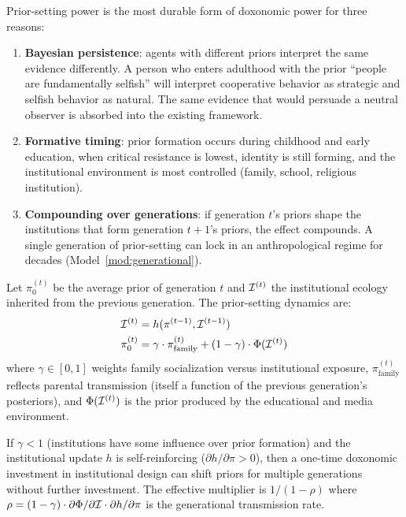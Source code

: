 Prior-setting power is the most durable form of doxonomic power for three reasons:

\begin{enumerate}[nosep]
  \item \textbf{Bayesian persistence}: agents with different priors interpret the same evidence differently.
  A person who enters adulthood with the prior ``people are fundamentally selfish'' will interpret cooperative behavior as strategic and selfish behavior as natural.
  The same evidence that would persuade a neutral observer is absorbed into the existing framework.

  \item \textbf{Formative timing}: prior formation occurs during childhood and early education, when critical resistance is lowest, identity is still forming, and the institutional environment is most controlled (family, school, religious institution).

  \item \textbf{Compounding over generations}: if generation $t$'s priors shape the institutions that form generation $t+1$'s priors, the effect compounds.
  A single generation of prior-setting can lock in an anthropological regime for decades (Model~\ref{mod:generational}).
\end{enumerate}

\begin{model}
\label{mod:prior-setting}
Let $\pi_0^{(t)}$ be the average prior of generation $t$ and $\mathcal{I}^{(t)}$ the institutional ecology inherited from the previous generation.
The prior-setting dynamics are:
\begin{align}
  \mathcal{I}^{(t)} &= h(\pi^{(t-1)}, \mathcal{I}^{(t-1)}) \label{eq:inst-update} \\
  \pi_0^{(t)} &= \gamma \cdot \pi_{\text{family}}^{(t)} + (1-\gamma) \cdot \Phi(\mathcal{I}^{(t)}) \label{eq:prior-formation}
\end{align}
where $\gamma \in [0,1]$ weights family socialization versus institutional exposure, $\pi_{\text{family}}^{(t)}$ reflects parental transmission (itself a function of the previous generation's posteriors), and $\Phi(\mathcal{I}^{(t)})$ is the prior produced by the educational and media environment.
\end{model}

\begin{proposition}
\label{prop:compounding}
If $\gamma < 1$ (institutions have some influence over prior formation) and the institutional update $h$ is self-reinforcing ($\partial h / \partial \pi > 0$), then a one-time doxonomic investment in institutional design can shift priors for multiple generations without further investment.
The effective multiplier is $1/(1-\rho)$ where $\rho = (1-\gamma) \cdot \partial\Phi/\partial\mathcal{I} \cdot \partial h/\partial\pi$ is the generational transmission rate.
\end{proposition}

